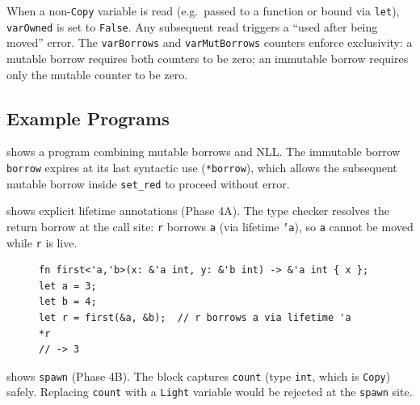 When a non-\texttt{Copy} variable is read (e.g.\ passed to a function or bound
via \texttt{let}), \texttt{varOwned} is set to \texttt{False}.
Any subsequent read triggers a ``used after being moved'' error.
The \texttt{varBorrows} and \texttt{varMutBorrows} counters enforce exclusivity:
a mutable borrow requires both counters to be zero; an immutable borrow requires
only the mutable counter to be zero.

\subsection{Example Programs}

 shows a program combining mutable borrows and NLL.
The immutable borrow \texttt{borrow} expires at its last syntactic use
(\texttt{*borrow}), which allows the subsequent mutable borrow inside
\texttt{set\_red} to proceed without error.

\begin{figure}[ht!]
    \centering
    \begin{minipage}{.9\linewidth}
        
    \end{minipage}
    \label{lst:example}
\end{figure}

 shows explicit lifetime annotations (Phase 4A).
The type checker resolves the return borrow at the call site: \texttt{r}
borrows \texttt{a} (via lifetime \texttt{'a}), so \texttt{a} cannot be moved
while \texttt{r} is live.

\begin{figure}[ht!]
    \centering
    \begin{minipage}{.9\linewidth}
\begin{lstlisting}
fn first<'a,'b>(x: &'a int, y: &'b int) -> &'a int { x };
let a = 3;
let b = 4;
let r = first(&a, &b);  // r borrows a via lifetime 'a
*r
// -> 3
\end{lstlisting}
    \end{minipage}
    \label{lst:lt-example}
\end{figure}

 shows \texttt{spawn} (Phase 4B).
The block captures \texttt{count} (type \texttt{int}, which is \texttt{Copy})
safely.
Replacing \texttt{count} with a \texttt{Light} variable would be rejected at
the \texttt{spawn} site.

